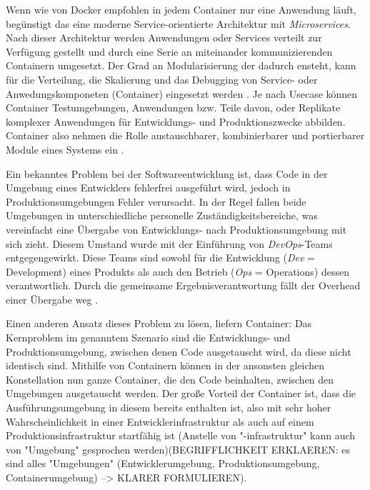 \documentclass[../main.tex]{subfiles}
\begin{document}

    Wenn wie von Docker empfohlen in jedem Container nur eine Anwendung läuft, begünstigt das eine moderne Service-orientierte Architektur mit \emph{Microservices}. Nach dieser Architektur werden Anwendungen oder Services verteilt zur Verfügung gestellt und durch eine Serie an miteinander kommunizierenden Containern umgesetzt. Der Grad an Modularisierung der dadurch ensteht, kann für die Verteilung, die Skalierung und das Debugging von Service- oder Anwedungskomponeten (Container) eingesetzt werden \cite[S.9]{dockerBook}. Je nach Usecase können Container Testumgebungen, Anwendungen bzw. Teile davon, oder Replikate komplexer Anwendungen für Entwicklungs- und Produktionszwecke abbilden. Container also nehmen die Rolle austauschbarer, kombinierbarer und portierbarer Module eines Systems ein \cite[S.12]{dockerBook}.

    Ein bekanntes Problem bei der Softwareentwicklung ist, dass Code in der Umgebung eines Entwicklers fehlerfrei ausgeführt wird, jedoch in Produktionsumgebungen Fehler verursacht. In der Regel fallen beide Umgebungen in unterschiedliche personelle Zuständigkeitsbereiche, was vereinfacht eine Übergabe von Entwicklungs- nach Produktionsumgebung mit sich zieht. Diesem Umstand wurde mit der Einführung von \emph{DevOps}-Teams entgegengewirkt. Diese Teams sind sowohl für die Entwicklung (\emph{Dev} = Development) eines Produkts als auch den Betrieb (\emph{Ops} = Operations) dessen verantwortlich. Durch die gemeinsame Ergebnisverantwortung fällt der Overhead einer Übergabe weg \cite{devops}.

    Einen anderen Ansatz dieses Problem zu lösen, liefern Container: Das Kernproblem im genanntem Szenario sind die Entwicklungs- und Produktionsumgebung, zwischen denen Code ausgetauscht wird, da diese nicht identisch sind. Mithilfe von Containern können in der ansonsten gleichen Konstellation nun ganze Container, die den Code beinhalten, zwischen den Umgebungen ausgetauscht werden. Der große Vorteil der Container ist, dass die Ausführungsumgebung in diesem bereits enthalten ist, also mit sehr hoher Wahrscheinlichkeit in einer Entwicklerinfrastruktur als auch auf einem Produktionsinfrastruktur startfähig ist (Anstelle von "-infrastruktur" kann auch von "Umgebung" gesprochen werden)(BEGRIFFLICHKEIT ERKLAEREN: es sind alles "Umgebungen" (Entwicklerumgebung, Produktionsumgebung, Containerumgebung) --> KLARER FORMULIEREN).
\end{document}
